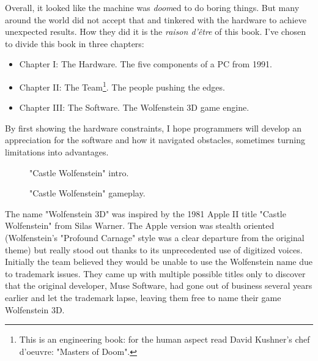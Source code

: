 Overall, it looked like the machine was \emph{doom}ed to do boring things. But many around the world did not accept that and tinkered with the hardware to achieve unexpected results. How they did it is the \textit{raison d'\^etre} of this book. I've chosen to divide this book in three chapters:
\begin{itemize}
\item Chapter I: The Hardware. The five components of a PC from 1991.
\item Chapter II: The Team\footnote{This is an engineering book: for the human aspect read David Kushner's chef d'oeuvre: "Masters of Doom".}. The people pushing the edges.
\item Chapter III: The Software. The Wolfenstein 3D game engine.
\end{itemize}
\par
By first showing the hardware constraints, I hope programmers will develop an appreciation for the software and how it navigated obstacles, sometimes turning limitations into advantages.\\
\par


\begin{figure}[H]
\centering
{}
\caption{"Castle Wolfenstein" intro.}
\end{figure}

\begin{figure}[H]
\centering
{}
\caption{"Castle Wolfenstein" gameplay.}
\end{figure}


 The name "Wolfenstein 3D" was inspired by the 1981 Apple II title "Castle Wolfenstein" from Silas Warner. The Apple version was stealth oriented (Wolfenstein's "Profound Carnage" style was a clear departure from the original theme) but really stood out thanks to its unprecedented use of digitized voices. Initially the team believed they would be unable to use the Wolfenstein name due to trademark issues. They came up with multiple possible titles only to discover that the original developer, Muse Software, had gone out of business several years earlier and let the trademark lapse, leaving them free to name their game Wolfenstein 3D.
